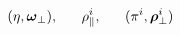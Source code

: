 \begin{equation}
(\eta, \mbox{\boldmath $\omega$}_{\perp}),~~~~~ \rho_{\parallel}^{i},~~~~~
(\pi^{i}, \mbox{\boldmath $\rho$}_{\perp}^{i}) 
\end{equation}


